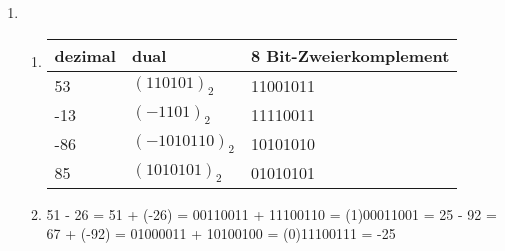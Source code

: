 \documentclass{article}
\begin{document}
    

\begin{enumerate}
    \item \begin{enumerate}
    \item  

    \begin{center}
    \large
        \begin{tabular}{| m{2.35cm} | m{2.35cm} | m{4.55cm} |}

            \hline
            dezimal & dual & 8 Bit-Zweierkomplement \\
            \hline
            53 & $(110101)_2$ & 11001011 \\
            \hline
            -13 & $(-1101)_2$ & 11110011 \\
            \hline
            -86 & $(-1010110)_2$ & 10101010 \\
            \hline
            85 & $(1010101)_2$ & 01010101 \\
            \hline
        
    \end{tabular}
\end{center}

\item
51 - 26 = 51 + (-26) = 00110011 + 11100110 = (1)00011001 = 25
 - 92 = 67 + (-92) = 01000011 + 10100100 = (0)11100111 = -25
\newline

\end{enumerate}
\end{enumerate}
\end{document}
